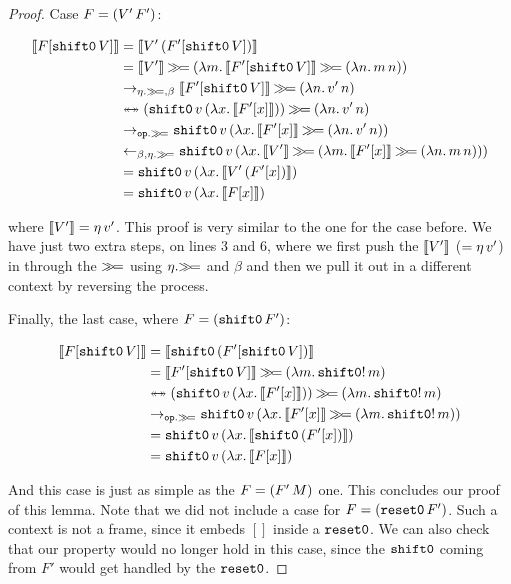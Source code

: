 \begin{proof}
Case $F = (V'\,F')$:

\begin{align}
  \sem{F[\ap{\shifto}{V}]}
  &= \sem{\ap{V'}{(F'[\ap{\shifto}{V}])}} \\
  &= \sem{V'} \hsbind (\lam{m}{\sem{F'[\ap{\shifto}{V}]} \hsbind (\lam{n}{\ap{m}{n}})}) \\
  &\to_{\eta.\hsbind,\beta} \sem{F'[\ap{\shifto}{V}]} \hsbind (\lam{n}{\ap{v'}{n}}) \\
  &\ttoffrom (\app{\op{shift0}}{v}{(\lam{x}{\sem{F'[x]}})}) \hsbind (\lam{n}{\ap{v'}{n}}) \\
  &\to_{\op{op}.\hsbind} \app{\op{shift0}}{v}{(\lam{x}{\sem{F'[x]} \hsbind (\lam{n}{\ap{v'}{n}})})}\\
  &\from_{\beta,\eta.\hsbind} \app{\op{shift0}}{v}{(\lam{x}{\sem{V'} \hsbind (\lam{m}{\sem{F'[x]} \hsbind (\lam{n}{\ap{m}{n}})})})}\\
  &= \app{\op{shift0}}{v}{(\lam{x}{\sem{\ap{V'}{(F'[x])}}})} \\
  &= \app{\op{shift0}}{v}{(\lam{x}{\sem{F[x]}})}
\end{align}
\setcounter{equation}{0}

where $\llbracket V' \rrbracket = \eta\,v'$. This proof is very similar to the one for
the case before. We have just two extra steps, on lines 3 and 6, where we
first push the $\llbracket V' \rrbracket$ ($= \eta\,v'$) in through the $\mathbin{\gg\!=}$
using $\eta.\mathbin{\gg\!=}$ and $\beta$ and then we pull it out in a different
context by reversing the process.

Finally, the last case, where $F = (\mathtt{shift0}\,F')$:

\begin{align}
  \llbracket F[\mathtt{shift0}\,V] \rrbracket
  &= \llbracket \mathtt{shift0}\,(F'[\mathtt{shift0}\,V]) \rrbracket \\
  &= \llbracket F'[\mathtt{shift0}\,V] \rrbracket \mathbin{\gg\!=} (\lambda m.\, \mathtt{shift0}!\,m) \\
  &\twoheadleftarrow \mathrel{\mkern-15mu} \twoheadrightarrow (\mathtt{shift0}\,v\,(\lambda x.\, \llbracket F'[x] \rrbracket)) \mathbin{\gg\!=} (\lambda m.\, \mathtt{shift0}!\,m) \\
  &\to_{\mathtt{op}.\mathbin{\gg\!=}} \mathtt{shift0}\,v\,(\lambda x.\, \llbracket F'[x] \rrbracket \mathbin{\gg\!=} (\lambda m.\, \mathtt{shift0}!\,m)) \\
  &= \mathtt{shift0}\,v\,(\lambda x.\, \llbracket \mathtt{shift0}\,(F'[x]) \rrbracket) \\
  &= \mathtt{shift0}\,v\,(\lambda x.\, \llbracket F[x] \rrbracket)
\end{align}
\setcounter{equation}{0}

And this case is just as simple as the $F = (F'\,M)$ one. This
concludes our proof of this lemma. Note that we did not include a case for
$F = (\mathtt{reset0}\,F')$. Such a context is not a frame, since it embeds
$[]$ inside a $\mathtt{reset0}$. We can also check that our property would no
longer hold in this case, since the $\mathtt{shift0}$ coming from $F'$ would get
handled by the $\mathtt{reset0}$.
\end{proof}


